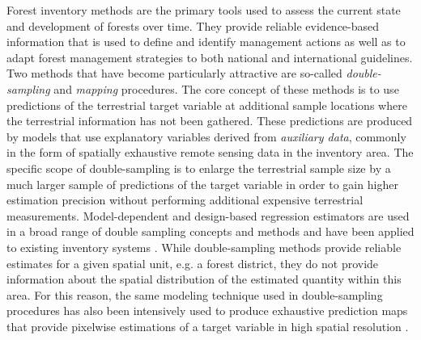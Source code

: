 Forest inventory methods are the primary tools used to assess the current state and development of forests over time. They provide reliable evidence-based information that is used to define and identify management actions as well as to adapt forest management strategies to both national and international guidelines. Two methods that have become particularly attractive are so-called \textit{double-sampling} \citep[]{mandallaz2008} and \textit{mapping}  procedures. The core concept of these methods is to use predictions of the terrestrial target variable at additional sample locations where the terrestrial information has not been gathered. These predictions are produced by models that use explanatory variables derived from \textit{auxiliary data}, commonly in the form of spatially exhaustive remote sensing data in the inventory area.  The specific scope of double-sampling is to enlarge the terrestrial sample size by a much larger sample of predictions of the target variable in order to gain higher estimation precision without performing additional expensive terrestrial measurements. Model-dependent and design-based regression estimators are used in a broad range of double sampling concepts and methods \citep{gregoire2007, kohl2006, schreuder1993, saborowski2010, mandallaz2013a, mandallaz2013c} and have been applied to existing inventory systems \citep{breidenbach2012, vonLuebke2014, mandallaz2013b, magnussen2014, massey2014a}. While double-sampling methods provide reliable estimates for a given spatial unit, e.g. a forest district, they do not provide information about the spatial distribution of the estimated quantity within this area. For this reason, the same modeling technique used in double-sampling procedures has also been intensively used to produce exhaustive prediction maps that provide pixelwise estimations of a target variable in high spatial resolution \citep{bohlin2017, latifi2010, tonolli2011, hill2014, nink2015}.\par

